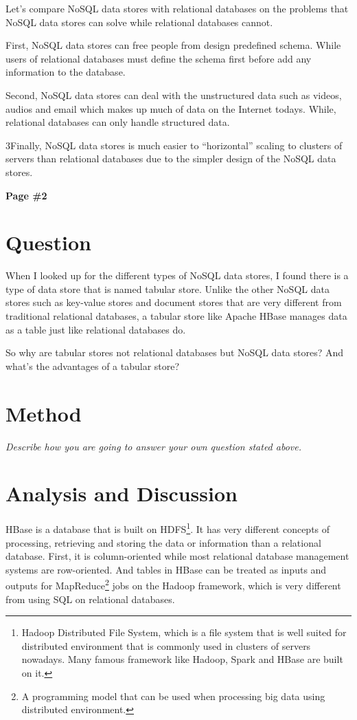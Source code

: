 \documentclass[12pt, a4paper]{article}
\begin{document}
Let's compare NoSQL data stores with relational databases on the problems that NoSQL data stores can solve while relational databases cannot.

First, NoSQL data stores can free people from design predefined schema. While users of relational databases must define the schema first before add any information to the database.\cite{diff}

Second, NoSQL data stores can deal with the unstructured data such as videos, audios and email which makes up much of data on the Internet todays. While, relational databases can only handle structured data.\cite{diff}

3Finally, NoSQL data stores is much easier to ``horizontal'' scaling to clusters of servers than relational databases due to the simpler design of the NoSQL data stores.\cite{wiki}


\newpage

\begin{center}
{\textbf{
Page \#2}}
\end{center}

\section{Question}

When I looked up for the different types of NoSQL data stores, I found there is a type of data store that is named tabular store. Unlike the other NoSQL data stores such as key-value stores and document stores that are very different from traditional relational databases, a tabular store like Apache HBase manages data as a table just like relational databases do.

So why are tabular stores not relational databases but NoSQL data stores? And what's the advantages of a tabular store?

\section{Method}

{\emph{Describe how you are going to answer your own question stated above.}}

\section{Analysis and Discussion}

HBase is a database that is built on HDFS\footnote{Hadoop Distributed File System, which is a file system that is well suited for distributed environment that is commonly used in clusters of servers nowadays. Many famous framework like Hadoop, Spark and HBase are built on it.}. It has very different concepts of processing, retrieving and storing the data or information than a relational database. First, it is column-oriented while most relational database management systems are row-oriented. And tables in HBase can be treated as inputs and outputs for MapReduce\footnote{A programming model that can be used when processing big data using distributed environment.} jobs on the Hadoop framework, which is very different from using SQL on relational databases.
\end{document}
